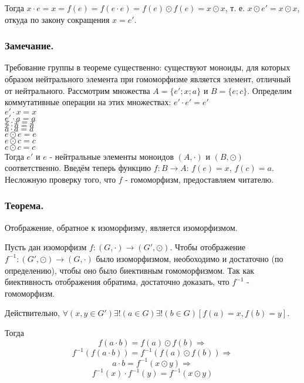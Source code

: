 Тогда $x \cdot e = x =f(e)=f(e \cdot e)=f(e)\odot f(e) = x \odot x$, т. е. 
$x \odot e' = x \odot x$, откуда по закону сокращения $x=e'$. 

\dokno

\subsubsection{Замечание.}
Требование группы в теореме существенно: существуют моноиды, для которых образом нейтрального элемента при гомоморфизме является элемент, отличный от нейтрального.
Рассмотрим множества $A=\{e'; x; a\}$ и $B=\{e; c\}$. Определим коммутативные операции на этих множествах:
$e' \cdot e' = e'$\\
$e' \cdot x  = x$\\
$e' \cdot a  = a$\\
$x  \cdot x  = x$\\
$x  \cdot a  = a$\\
$a  \cdot a  = a$\\
$e \odot e  = e$\\
$e \odot c  = c$\\
$c \odot c  = c$\\

Тогда $e'$ и $e$ - нейтральные элементы моноидов $(A,\cdot)$ и $(B,\odot)$ соответственно. Введём теперь функцию $f:B \to A$: $f(e)=x$, $f(c)=a$. Несложную проверку того, что $f$ - гомоморфизм, предоставляем читателю.

\subsubsection{Теорема.}

Отображение, обратное к изоморфизму, является изоморфизмом.

\dokvo

Пусть дан изоморфизм $f:(G,\cdot)\to(G',\odot)$.
Чтобы отображение $f^{-1}:(G',\odot)\to(G,\cdot)$ было изоморфизмом, необоходимо и достаточно (по определению), чтобы оно было биективным гомоморфизмом. Так как биективность отображения обратима, достаточно доказать, что $f^{-1}$ - гомоморфизм.

Действительно, $\forall(x,y \in G')\exists!(a \in G)\exists!(b \in G)[f(a)=x, f(b)=y]$.

Тогда
$$f(a \cdot b)= f(a) \odot f(b) \Rightarrow$$
$$f^{-1}(f(a \cdot b))= f^{-1}(f(a) \odot f(b)) \Rightarrow$$
$$a \cdot b= f^{-1}(x \odot y) \Rightarrow$$
$$f^{-1}(x) \cdot f^{-1}(y)= f^{-1}(x \odot y)$$

